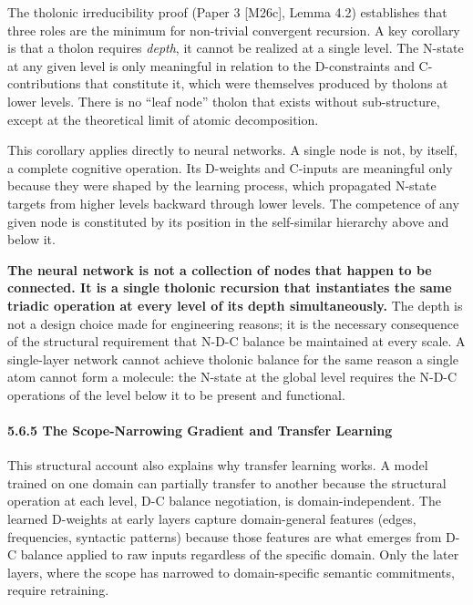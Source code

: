 \documentclass[
  11pt,
  letterpaper,
]{article}
\begin{document}
The tholonic irreducibility proof (Paper 3 {[}M26c{]}, Lemma 4.2)
establishes that three roles are the minimum for non-trivial convergent
recursion. A key corollary is that a tholon requires \emph{depth}, it
cannot be realized at a single level. The N-state at any given level is
only meaningful in relation to the D-constraints and C-contributions
that constitute it, which were themselves produced by tholons at lower
levels. There is no ``leaf node'' tholon that exists without
sub-structure, except at the theoretical limit of atomic decomposition.

This corollary applies directly to neural networks. A single node is
not, by itself, a complete cognitive operation. Its D-weights and
C-inputs are meaningful only because they were shaped by the learning
process, which propagated N-state targets from higher levels backward
through lower levels. The competence of any given node is constituted by
its position in the self-similar hierarchy above and below it.

\textbf{The neural network is not a collection of nodes that happen to
be connected. It is a single tholonic recursion that instantiates the
same triadic operation at every level of its depth simultaneously.} The
depth is not a design choice made for engineering reasons; it is the
necessary consequence of the structural requirement that N-D-C balance
be maintained at every scale. A single-layer network cannot achieve
tholonic balance for the same reason a single atom cannot form a
molecule: the N-state at the global level requires the N-D-C operations
of the level below it to be present and functional.

\paragraph{5.6.5 The Scope-Narrowing Gradient and Transfer
Learning}\label{the-scope-narrowing-gradient-and-transfer-learning}

This structural account also explains why transfer learning works. A
model trained on one domain can partially transfer to another because
the structural operation at each level, D-C balance negotiation, is
domain-independent. The learned D-weights at early layers capture
domain-general features (edges, frequencies, syntactic patterns) because
those features are what emerges from D-C balance applied to raw inputs
regardless of the specific domain. Only the later layers, where the
scope has narrowed to domain-specific semantic commitments, require
retraining.
\end{document}
